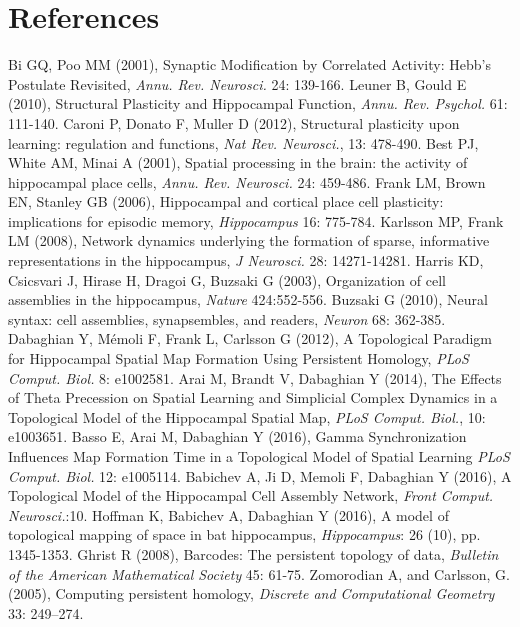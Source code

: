 \documentclass[12pt,tightenlines]{revtex4}
\begin{document}
\section{References}
\begin{thebibliography}{99}
 Bi GQ, Poo MM (2001), Synaptic Modification by Correlated Activity: Hebb's Postulate Revisited, \emph{Annu. Rev. Neurosci.} 24: 139-166.
 Leuner B, Gould E (2010), Structural Plasticity and Hippocampal Function, \emph{Annu. Rev. Psychol.} 61: 111-140.
 Caroni P, Donato F, Muller D (2012), Structural plasticity upon learning: regulation and functions, \emph{Nat Rev. Neurosci.}, 13: 478-490.
 Best PJ, White AM, Minai A (2001), Spatial processing in the brain: the activity of hippocampal place cells, \emph{Annu. Rev. Neurosci.} 24: 459-486.
 Frank LM, Brown EN, Stanley GB (2006), Hippocampal and cortical place cell plasticity: implications for episodic memory, \emph{Hippocampus} 16: 775-784.
 Karlsson MP, Frank LM (2008), Network dynamics underlying the formation of sparse, informative representations in the hippocampus, \emph{J Neurosci.} 28: 14271-14281.
 Harris KD, Csicsvari J, Hirase H, Dragoi G, Buzsaki G (2003), Organization of cell assemblies in the hippocampus, \emph{Nature} 424:552-556.
 Buzsaki G (2010), Neural syntax: cell assemblies, synapsembles, and readers, \emph{Neuron} 68: 362-385.
 Dabaghian Y, Mémoli F, Frank L, Carlsson G (2012), A Topological Paradigm for Hippocampal Spatial Map Formation Using Persistent Homology, \emph{PLoS Comput. Biol.} 8: e1002581.
 Arai M, Brandt V, Dabaghian Y (2014), The Effects of Theta Precession on Spatial Learning and Simplicial Complex Dynamics in a Topological Model of the Hippocampal Spatial Map, \emph{PLoS Comput. Biol.}, 10: e1003651.
 Basso E, Arai M, Dabaghian Y (2016), Gamma Synchronization Influences Map Formation Time in a Topological Model of Spatial Learning \emph{PLoS Comput. Biol.} 12: e1005114.
 Babichev A, Ji D, Memoli F, Dabaghian Y (2016), A Topological Model of the Hippocampal Cell Assembly Network, \emph{Front Comput. Neurosci.}:10.
 Hoffman K, Babichev A, Dabaghian Y (2016), A model of topological mapping of space in bat hippocampus, \emph{Hippocampus}: 26 (10), pp. 1345-1353.
 Ghrist R (2008), Barcodes: The persistent topology of data, \emph{Bulletin of the American Mathematical Society} 45: 61-75.
 Zomorodian A, and Carlsson, G. (2005), Computing persistent homology, \emph{Discrete and Computational Geometry} 33: 249--274.

\end{thebibliography}
\end{document}
